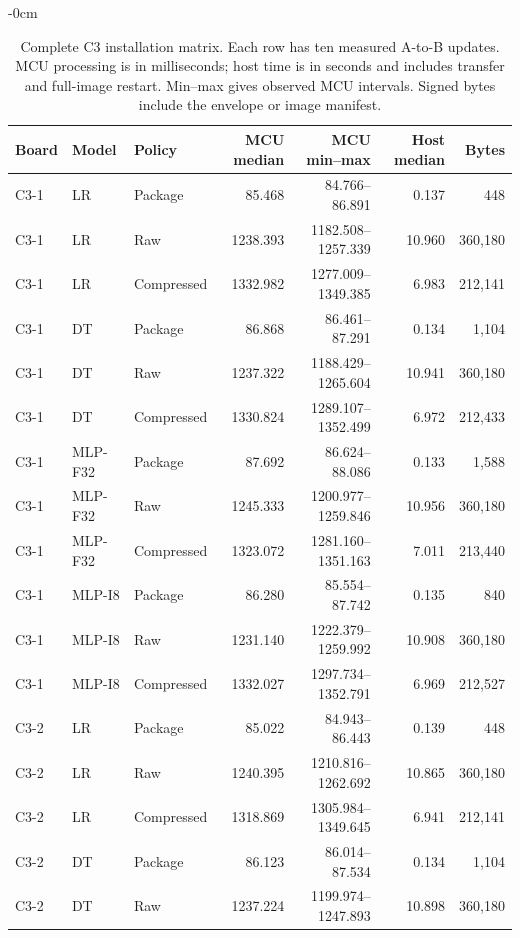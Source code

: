 \begin{table}[!htbp]
\begin{adjustwidth}{-\extralength}{0cm}
\color{RevisionBlue}
\captionsetup{font+=revisionblue}
\caption{Complete C3 installation matrix. Each row has ten measured A-to-B updates. MCU processing is in milliseconds; host time is in seconds and includes transfer and full-image restart. Min--max gives observed MCU intervals. Signed bytes include the envelope or image manifest.}\label{tab:c3-cost-details}
\centering\footnotesize\setlength{\tabcolsep}{4pt}
\begin{tabular}{lllrrrr}
\toprule Board & Model & Policy & MCU median & MCU min--max & Host median & Bytes\\
\midrule
C3-1 & LR & Package & 85.468 & 84.766--86.891 & 0.137 & 448\\
C3-1 & LR & Raw & 1238.393 & 1182.508--1257.339 & 10.960 & 360,180\\
C3-1 & LR & Compressed & 1332.982 & 1277.009--1349.385 & 6.983 & 212,141\\
C3-1 & DT & Package & 86.868 & 86.461--87.291 & 0.134 & 1,104\\
C3-1 & DT & Raw & 1237.322 & 1188.429--1265.604 & 10.941 & 360,180\\
C3-1 & DT & Compressed & 1330.824 & 1289.107--1352.499 & 6.972 & 212,433\\
C3-1 & MLP-F32 & Package & 87.692 & 86.624--88.086 & 0.133 & 1,588\\
C3-1 & MLP-F32 & Raw & 1245.333 & 1200.977--1259.846 & 10.956 & 360,180\\
C3-1 & MLP-F32 & Compressed & 1323.072 & 1281.160--1351.163 & 7.011 & 213,440\\
C3-1 & MLP-I8 & Package & 86.280 & 85.554--87.742 & 0.135 & 840\\
C3-1 & MLP-I8 & Raw & 1231.140 & 1222.379--1259.992 & 10.908 & 360,180\\
C3-1 & MLP-I8 & Compressed & 1332.027 & 1297.734--1352.791 & 6.969 & 212,527\\
C3-2 & LR & Package & 85.022 & 84.943--86.443 & 0.139 & 448\\
C3-2 & LR & Raw & 1240.395 & 1210.816--1262.692 & 10.865 & 360,180\\
C3-2 & LR & Compressed & 1318.869 & 1305.984--1349.645 & 6.941 & 212,141\\
C3-2 & DT & Package & 86.123 & 86.014--87.534 & 0.134 & 1,104\\
C3-2 & DT & Raw & 1237.224 & 1199.974--1247.893 & 10.898 & 360,180\\

\end{tabular}
\end{adjustwidth}
\end{table}
